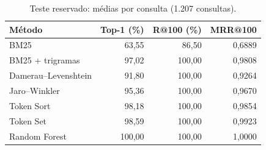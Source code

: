 \begin{table}[tb]
\caption{Teste reservado: médias por consulta (1.207 consultas).}
\label{tab:principal}
\centering
\small
\setlength{\tabcolsep}{3pt}
\begin{tabular}{lrrr}
\toprule
Método & Top-1 (\%) & R@100 (\%) & MRR@100 \\
\midrule
BM25 & 63,55 & 86,50 & 0,6889 \\
BM25 + trigramas & 97,02 & 100,00 & 0,9808 \\
Damerau--Levenshtein & 91,80 & 100,00 & 0,9264 \\
Jaro--Winkler & 95,36 & 100,00 & 0,9670 \\
Token Sort & 98,18 & 100,00 & 0,9854 \\
Token Set & 98,59 & 100,00 & 0,9923 \\
Random Forest & 100,00 & 100,00 & 1,0000 \\
\bottomrule
\end{tabular}
\par{}
\end{table}
